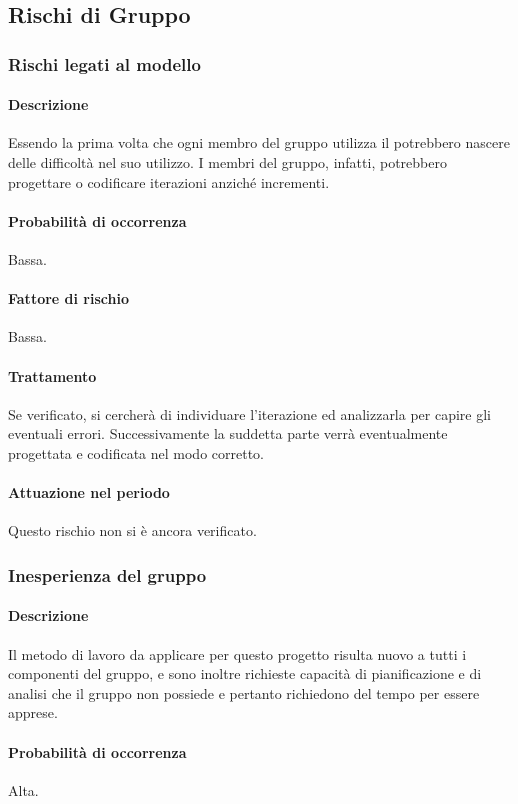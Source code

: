 \subsection{Rischi di Gruppo}

\subsubsection{Rischi legati al modello}
\paragraph{Descrizione} 
Essendo la prima volta che ogni membro del gruppo utilizza il  potrebbero nascere delle difficoltà nel suo utilizzo. I membri del gruppo, infatti, potrebbero progettare o codificare iterazioni anziché incrementi.
\paragraph{Probabilità di occorrenza}
Bassa.
\paragraph{Fattore di rischio}
Bassa.
\paragraph{Trattamento}
Se verificato, si cercherà di individuare l'iterazione ed analizzarla per capire gli eventuali errori. Successivamente la suddetta parte verrà eventualmente progettata e codificata nel modo corretto.
\paragraph{Attuazione nel periodo}
Questo rischio non si è ancora verificato.


\subsubsection{Inesperienza del gruppo}
\paragraph{Descrizione} 
Il metodo di lavoro da applicare per questo progetto risulta nuovo a tutti i componenti del gruppo, e sono inoltre richieste capacità di pianificazione e di analisi che il gruppo non possiede e pertanto richiedono del tempo per essere apprese.
\paragraph{Probabilità di occorrenza}
Alta.
